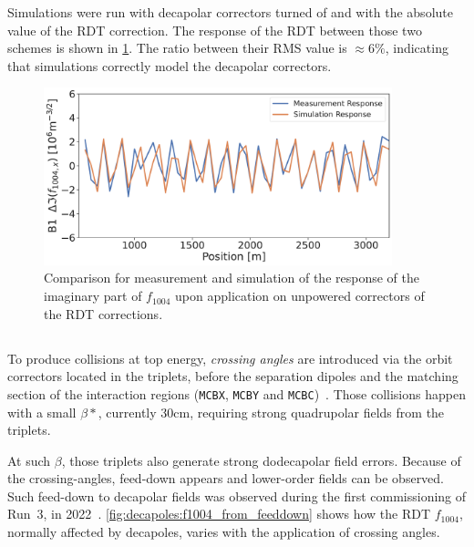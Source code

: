 Simulations were run with decapolar correctors turned of and with the absolute value of the RDT
correction. The response of the RDT between those two schemes is shown in 
\cref{fig:decapoles:rdt:b1_response_corr}. The ratio between their RMS value is $\approx 6\%$,
indicating that simulations correctly model the decapolar correctors.

\begin{figure}[!htb]
    \centering
    \includegraphics[width=0.9\textwidth]{./images/f1004/b1_response_rdt_corr.pdf}
    \caption{Comparison for measurement and simulation of the response of the imaginary part of
    $f_{1004}$ upon application on unpowered correctors of the RDT corrections.}
    \label{fig:decapoles:rdt:b1_response_corr}
\end{figure}



\subsection{}


To produce collisions at top energy, \textit{crossing angles} are introduced via the orbit
correctors located in the triplets, before the separation dipoles and the matching section of the
interaction regions (\texttt{MCBX}, \texttt{MCBY} and \texttt{MCBC})~\cite{de_maria_lhc_2008}. Those
collisions happen with a small $\beta*$, currently 30cm, requiring strong quadrupolar fields from
the triplets.

At such $\beta$, those triplets also generate strong dodecapolar field errors. Because of the
crossing-angles, feed-down appears and lower-order fields can be observed.
Such feed-down to decapolar fields was observed during the first commissioning of Run~3, in
2022~\cite{maclean_prospects_2022}.
\cref{fig:decapoles:f1004_from_feeddown} shows how the RDT $f_{1004}$, normally affected by
decapoles, varies with the application of crossing angles.

